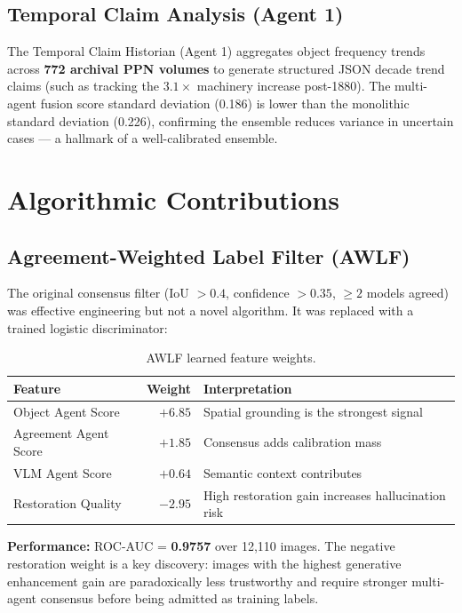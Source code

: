 \documentclass[11pt,a4paper]{article}
\theoremstyle{plain}
\begin{document}
\subsection{Temporal Claim Analysis (Agent 1)}

The Temporal Claim Historian (Agent 1) aggregates object frequency trends across \textbf{772 archival PPN volumes} to generate structured JSON decade trend claims (such as tracking the $3.1\times$ machinery increase post-1880). The multi-agent fusion score standard deviation (0.186) is lower than the monolithic standard deviation (0.226), confirming the ensemble reduces variance in uncertain cases — a hallmark of a well-calibrated ensemble.

\section{Algorithmic Contributions}

\subsection{Agreement-Weighted Label Filter (AWLF)}

The original consensus filter (IoU $> 0.4$, confidence $> 0.35$, $\geq 2$ models agreed) was effective engineering but not a novel algorithm. It was replaced with a trained logistic discriminator:

\begin{table}[h]
\centering
\caption{AWLF learned feature weights.}
\renewcommand{\arraystretch}{1.25}
\begin{tabular}{lrl}
\toprule
\textbf{Feature} & \textbf{Weight} & \textbf{Interpretation} \\
\midrule
Object Agent Score    & $+6.85$ & Spatial grounding is the strongest signal \\
Agreement Agent Score & $+1.85$ & Consensus adds calibration mass \\
VLM Agent Score       & $+0.64$ & Semantic context contributes \\
Restoration Quality   & $-2.95$ & High restoration gain increases hallucination risk \\
\bottomrule
\end{tabular}
\end{table}

\textbf{Performance:} ROC-AUC = \textbf{0.9757} over 12{,}110 images. The negative restoration weight is a key discovery: images with the highest generative enhancement gain are paradoxically less trustworthy and require stronger multi-agent consensus before being admitted as training labels.
\end{document}
